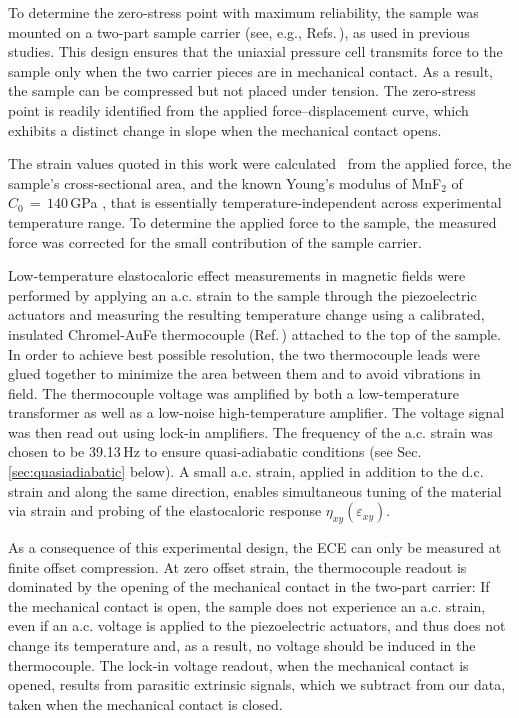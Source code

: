 \documentclass[
 reprint,










 amsmath,amssymb,
 aps,






]{revtex4-2}
\begin{document}
To determine the zero-stress point with maximum reliability, the sample was mounted on a two-part sample carrier (see, e.g., Refs.\,\cite{Jerzembeck22,Lieberich25}), as used in previous studies. This design ensures that the uniaxial pressure cell transmits force to the sample only when the two carrier pieces are in mechanical contact. As a result, the sample can be compressed but not placed under tension. The zero-stress point is readily identified from the applied force--displacement curve, which exhibits a distinct change in slope when the mechanical contact opens.

The strain values quoted in this work were calculated~\cite{Noa23} from the applied force, the sample's cross-sectional area, and the known Young's modulus of MnF$_2$ of $C_0\,=\,140\,$GPa \cite{Mel70}, that is essentially temperature-independent across experimental temperature range. To determine the applied force to the sample, the measured force was corrected for the small contribution of the sample carrier.

Low-temperature elastocaloric effect measurements \cite{Ike19,Li22,Ye24} in magnetic fields were performed by applying an a.c. strain to the sample through the piezoelectric actuators and measuring the resulting temperature change using a calibrated, insulated Chromel-AuFe thermocouple (Ref.\,\cite{Sto11}) attached to the top of the sample. In order to achieve best possible resolution, the two thermocouple leads were glued together to minimize the area between them and to avoid vibrations in field. The thermocouple voltage was amplified by both a low-temperature transformer as well as a low-noise high-temperature amplifier. The voltage signal was then read out using lock-in amplifiers. The frequency of the a.c. strain was chosen to be 39.13\,Hz to ensure quasi-adiabatic conditions (see Sec.\,\ref{sec:quasiadiabatic} below). A small a.c. strain, applied in addition to the d.c. strain and along the same direction, enables simultaneous tuning of the material via strain and probing of the elastocaloric response $\eta_{xy}(\varepsilon_{xy})$.


As a consequence of this experimental design, the ECE can only be measured at finite offset compression. At zero offset strain, the thermocouple readout is dominated by the opening of the mechanical contact in the two-part carrier: If the mechanical contact is open, the sample does not experience an a.c. strain, even if an a.c. voltage is applied to the piezoelectric actuators, and thus does not change its temperature and, as a result, no voltage should be induced in the thermocouple. The lock-in voltage readout, when the mechanical contact is opened, results from parasitic extrinsic signals, which we subtract from our data, taken when the mechanical contact is closed.
\end{document}
